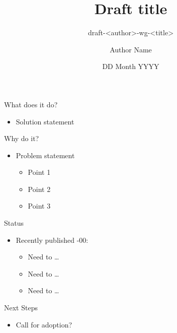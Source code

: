 \documentclass[aspectratio=43,t]{beamer}
\title{Draft title}
\subtitle{draft-\textless author\textgreater-wg-\textless title\textgreater}
\author{Author Name}
\institute{IETF NNN City}
\date{DD Month YYYY}
\begin{document}
\begin{frame}[plain]
  \titlepage
\end{frame}

\begin{frame}{What does it do?}
  \begin{itemize}
    \item Solution statement
  \end{itemize}
\end{frame}

\begin{frame}{Why do it?}
  \begin{itemize}
    \item Problem statement
      \begin{itemize}
        \item Point 1
        \item Point 2
        \item Point 3
      \end{itemize}
  \end{itemize}
\end{frame}

\begin{frame}{Status}
  \begin{itemize}
    \item Recently published -00:
      \begin{itemize}
        \item Need to \ldots
        \item Need to \ldots
        \item Need to \ldots
      \end{itemize}
  \end{itemize}
\end{frame}

\begin{frame}{Next Steps}
  \begin{itemize}
    \item Call for adoption?
  \end{itemize}
\end{frame}
\end{document}

